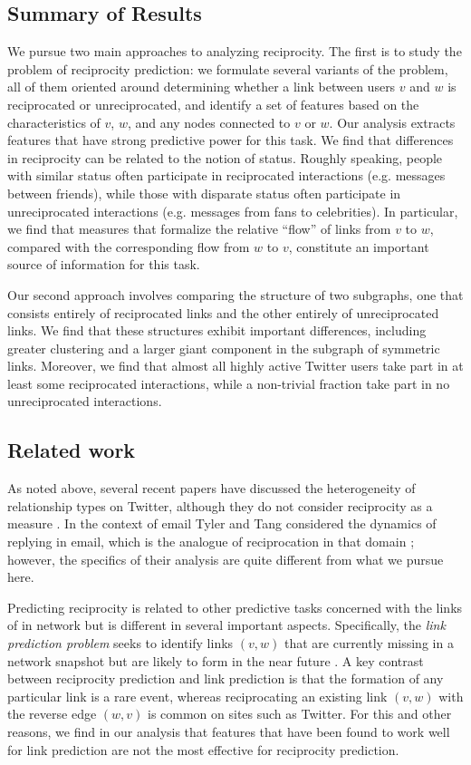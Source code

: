 \documentclass[conference]{IEEEtran}
\begin{document}
\subsection{Summary of Results}

We pursue two main approaches to analyzing reciprocity.
The first is to study the problem of reciprocity prediction:
we formulate several variants of the problem, all of them
oriented around determining whether a link between users $v$ and $w$
is reciprocated or unreciprocated, 
and identify a set of features based on the characteristics of $v$, $w$,
and any nodes connected to $v$ or $w$.  
Our analysis extracts features that have strong predictive
power for this task.
We find that differences in reciprocity can be related to the 
notion of status.
Roughly speaking, people with similar status often participate in reciprocated
interactions (e.g. messages between friends), while those with
disparate status often participate in unreciprocated interactions (e.g.
messages from fans to celebrities).
In particular, we find that measures that formalize the 
relative ``flow'' of links from $v$ to $w$,
compared with the corresponding flow from $w$ to $v$, constitute
an important source of information for this task.

Our second approach involves comparing the structure of two subgraphs, 
one that consists entirely of reciprocated links and the other
entirely of unreciprocated links.
We find that these structures exhibit important differences, including 
greater clustering and a larger giant component in the
subgraph of symmetric links.
Moreover, we find that almost all highly active Twitter users
take part in at least some reciprocated interactions, 
while a non-trivial fraction take part in no unreciprocated interactions.

\subsection{Related work}

As noted above, several recent papers have discussed the 
heterogeneity of relationship types on Twitter,
although they do not consider reciprocity as a measure
\cite{kwak-what-is-twitter,romero-directed-closure}.
In the context of email Tyler and Tang considered the dynamics
of replying in email, which is the analogue of reciprocation
in that domain \cite{Tyler:2003tq}; however, the specifics of their
analysis are quite different from what we pursue here.

Predicting reciprocity is related to other predictive tasks
concerned with the links of in network but is different in several
important aspects.
Specifically, the {\em link prediction problem} seeks to identify
links $(v,w)$ that are currently missing in a network snapshot
but are likely to form in the near future
\cite{liben-nowell-link-pred}.
A key contrast between reciprocity prediction and link prediction
is that the formation of any particular link is a rare event,
whereas reciprocating an existing link $(v,w)$ with
the reverse edge $(w,v)$ is common on sites such as Twitter.
For this and other reasons, we find in our analysis that features 
that have been found to work well for link 
prediction are not the most effective for reciprocity prediction.
\end{document}
